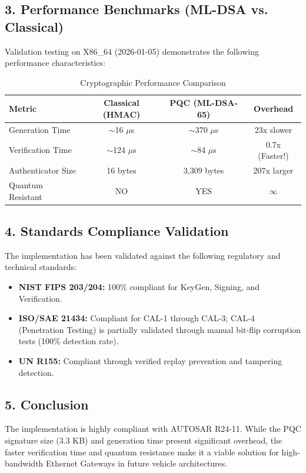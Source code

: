 \subsection{3. Performance Benchmarks (ML-DSA vs. Classical)}
Validation testing on X86_64 (2026-01-05) demonstrates the following performance characteristics:

\begin{table}[h]
\centering
\begin{tabular}{|l|c|c|c|}
\hline
\textbf{Metric} & \textbf{Classical (HMAC)} & \textbf{PQC (ML-DSA-65)} & \textbf{Overhead} \\ \hline
Generation Time & $\sim$16 $\mu$s & $\sim$370 $\mu$s & 23x slower \\ \hline
Verification Time & $\sim$124 $\mu$s & $\sim$84 $\mu$s & 0.7x (Faster!) \\ \hline
Authenticator Size & 16 bytes & 3,309 bytes & 207x larger \\ \hline
Quantum Resistant & NO & YES & $\infty$ \\ \hline
\end{tabular}
\caption{Cryptographic Performance Comparison}
\end{table}

\subsection{4. Standards Compliance Validation}
The implementation has been validated against the following regulatory and technical standards:
\begin{itemize}
    \item \textbf{NIST FIPS 203/204:} 100\% compliant for KeyGen, Signing, and Verification.
    \item \textbf{ISO/SAE 21434:} Compliant for CAL-1 through CAL-3; CAL-4 (Penetration Testing) is partially validated through manual bit-flip corruption tests (100\% detection rate).
    \item \textbf{UN R155:} Compliant through verified replay prevention and tampering detection.
\end{itemize}

\subsection{5. Conclusion}
The implementation is highly compliant with AUTOSAR R24-11. While the PQC signature size (3.3 KB) and generation time present significant overhead, the faster verification time and quantum resistance make it a viable solution for high-bandwidth Ethernet Gateways in future vehicle architectures.